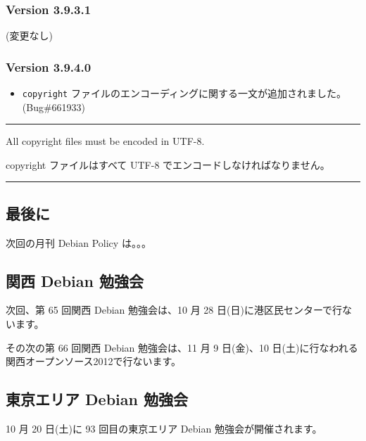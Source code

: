 \documentclass[mingoth,a4paper]{jsarticle}
\begin{document}
\clearpage

\subsubsection{Version 3.9.3.1}

(変更なし)

\subsubsection{Version 3.9.4.0}
\begin{itemize}
\item {\tt copyright} ファイルのエンコーディングに関する一文が追加されました。(Bug\#661933)
\end{itemize}

\vspace{1ex}
\hrule
{}\par
\parbox{0.48\linewidth}{
	  All copyright files must be encoded in UTF-8.
}\hfil 
\parbox{0.48\linewidth}{
	  copyright ファイルはすべて UTF-8 でエンコードしなければなりません。
}
\hrule
\vspace{1ex}

\subsection{最後に}
次回の月刊 Debian Policy は。。。

\clearpage


\subsection{関西 Debian 勉強会}

次回、第 65 回関西 Debian 勉強会は、10 月 28 日(日)に港区民センターで行ないます。

その次の第 66 回関西 Debian 勉強会は、11 月 9 日(金)、10 日(土)に行なわれる関西オープンソース2012で行ないます。


\subsection{東京エリア Debian 勉強会}
10 月 20 日(土)に 93 回目の東京エリア Debian 勉強会が開催されます。


\mbox{}\newpage
\mbox{}\newpage
\end{document}
